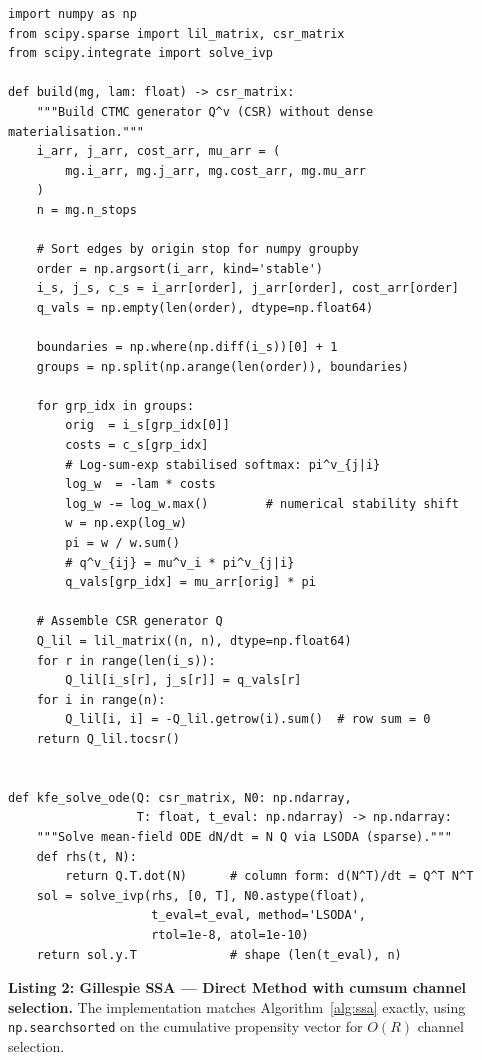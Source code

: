 \documentclass[11pt,a4paper]{article}
\theoremstyle{plain}
\theoremstyle{definition}
\theoremstyle{remark}
\begin{document}
\begin{lstlisting}[caption={Generator construction and KFE solve
  (\texttt{bkk/generator.py}, abridged).},label={lst:generator}]
import numpy as np
from scipy.sparse import lil_matrix, csr_matrix
from scipy.integrate import solve_ivp

def build(mg, lam: float) -> csr_matrix:
    """Build CTMC generator Q^v (CSR) without dense materialisation."""
    i_arr, j_arr, cost_arr, mu_arr = (
        mg.i_arr, mg.j_arr, mg.cost_arr, mg.mu_arr
    )
    n = mg.n_stops

    # Sort edges by origin stop for numpy groupby
    order = np.argsort(i_arr, kind='stable')
    i_s, j_s, c_s = i_arr[order], j_arr[order], cost_arr[order]
    q_vals = np.empty(len(order), dtype=np.float64)

    boundaries = np.where(np.diff(i_s))[0] + 1
    groups = np.split(np.arange(len(order)), boundaries)

    for grp_idx in groups:
        orig  = i_s[grp_idx[0]]
        costs = c_s[grp_idx]
        # Log-sum-exp stabilised softmax: pi^v_{j|i}
        log_w  = -lam * costs
        log_w -= log_w.max()        # numerical stability shift
        w = np.exp(log_w)
        pi = w / w.sum()
        # q^v_{ij} = mu^v_i * pi^v_{j|i}
        q_vals[grp_idx] = mu_arr[orig] * pi

    # Assemble CSR generator Q
    Q_lil = lil_matrix((n, n), dtype=np.float64)
    for r in range(len(i_s)):
        Q_lil[i_s[r], j_s[r]] = q_vals[r]
    for i in range(n):
        Q_lil[i, i] = -Q_lil.getrow(i).sum()  # row sum = 0
    return Q_lil.tocsr()


def kfe_solve_ode(Q: csr_matrix, N0: np.ndarray,
                  T: float, t_eval: np.ndarray) -> np.ndarray:
    """Solve mean-field ODE dN/dt = N Q via LSODA (sparse)."""
    def rhs(t, N):
        return Q.T.dot(N)      # column form: d(N^T)/dt = Q^T N^T
    sol = solve_ivp(rhs, [0, T], N0.astype(float),
                    t_eval=t_eval, method='LSODA',
                    rtol=1e-8, atol=1e-10)
    return sol.y.T             # shape (len(t_eval), n)
\end{lstlisting}

\textbf{Listing 2: Gillespie SSA --- Direct Method with cumsum channel
selection.}
The implementation matches Algorithm~\ref{alg:ssa} exactly, using
\texttt{np.searchsorted} on the cumulative propensity vector for $O(R)$ channel
selection.
\end{document}
